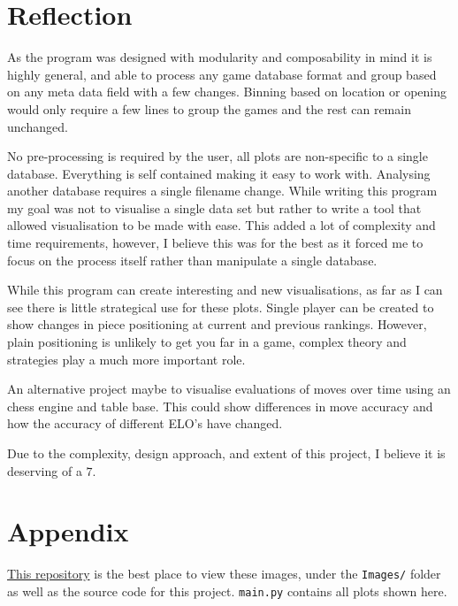 \documentclass[11pt]{article}
\begin{document}
\section{Reflection}
\label{sec:orgaa8eb12}
As the program was designed with modularity and composability in mind it is highly general, and able to process any game database format and group based on any meta data field with a few changes. Binning based on location or opening would only require a few lines to group the games and the rest can remain unchanged.

No pre-processing is required by the user, all plots are non-specific to a single database. Everything is self contained making it easy to work with. Analysing another database requires a single filename change.
While writing this program my goal was not to visualise a single data set but rather to write a tool that allowed visualisation to be made with ease. This added a lot of complexity and time requirements, however, I believe this was for the best as it forced me to focus on the process itself rather than manipulate a single database.

While this program can create interesting and new visualisations, as far as I can see there is little strategical use for these plots. Single player can be created to show changes in piece positioning at current and previous rankings. However, plain positioning is unlikely to get you far in a game, complex theory and strategies play a much more important role.

An alternative project maybe to visualise evaluations of moves over time using an chess engine and table base. This could show differences in move accuracy and how the accuracy of different ELO's have changed.

Due to the complexity, design approach, and extent of this project, I believe it is deserving of a \(7\).
\newpage


\newpage
\section{Appendix}
\label{sec:orgac6d72f}
\href{https://github.com/Jake-Moss/chess-analysis/tree/master/Images}{This repository} is the best place to view these images, under the \texttt{Images/} folder as well as the source code for this project. \texttt{main.py} contains all plots shown here.
\end{document}
